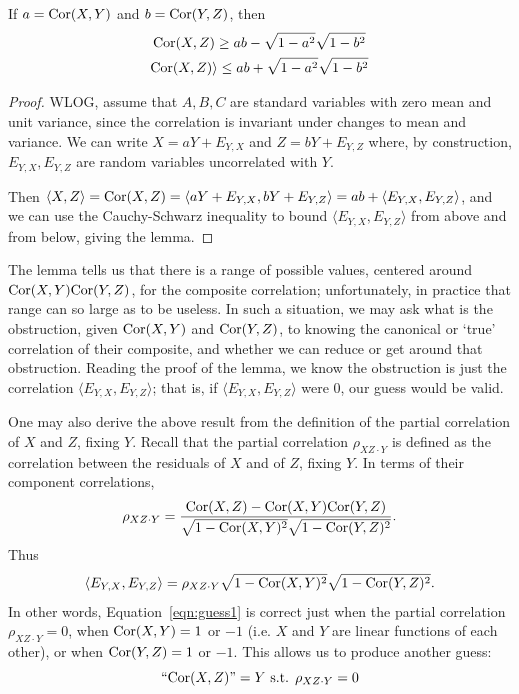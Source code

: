 \documentclass[sigconf]{acmart}
\def\Cor{\textnormal{Cor}}
\begin{document}
\begin{lemma}If $a = \Cor(X,Y)$ and $b = \Cor(Y,Z)$, then 
\begin{gather}
\Cor(X,Z) \geq ab - \sqrt{1-a^2}\sqrt{1-b^2} \\ 
\Cor(X,Z) \rangle \leq ab + \sqrt{1-a^2}\sqrt{1-b^2}
\end{gather}
\end{lemma}

\begin{proof}
WLOG, assume that $A,B,C$ are standard variables with zero mean and unit variance, since the correlation is invariant under changes to mean and variance. We can write $X = a Y + E_{Y,X}$ and $Z = b Y + E_{Y,Z}$ where, by construction, $E_{Y,X}, E_{Y,Z}$ are random variables uncorrelated with $Y$.

Then $\langle X, Z \rangle = \Cor(X,Z) = \langle aY + E_{Y,X}, bY + E_{Y,Z} \rangle = ab + \langle E_{Y,X}, E_{Y,Z} \rangle$, and we can use the Cauchy-Schwarz inequality to bound $\langle E_{Y,X}, E_{Y,Z} \rangle$ from above and from below, giving the lemma.
\end{proof}

The lemma tells us that there is a range of possible values, centered around $\Cor(X,Y)\Cor(Y,Z)$, for the composite correlation; unfortunately, in practice that range can so large as to be useless. In such a situation, we may ask what is the obstruction, given $\Cor(X,Y)$ and $\Cor(Y,Z)$, to knowing the canonical or `true' correlation of their composite, and whether we can reduce or get around that obstruction. Reading the proof of the lemma, we know the obstruction is just the correlation $\langle E_{Y,X}, E_{Y,Z} \rangle$; that is, if $\langle E_{Y,X}, E_{Y,Z} \rangle$ were 0, our guess would be valid.

One may also derive the above result from the definition of the partial correlation of $X$ and $Z$, fixing $Y$. Recall that the partial correlation $\rho_{XZ \cdot Y}$ is defined as the correlation between the residuals of $X$ and of $Z$, fixing $Y$. In terms of their component correlations,
\[ \rho_{XZ \cdot Y} = \frac{\Cor(X,Z) - \Cor(X,Y)\Cor(Y,Z)}{\sqrt{1-\Cor(X,Y)^2}\sqrt{1-\Cor(Y,Z)^2}}. \]
Thus 
\[\langle E_{Y,X}, E_{Y,Z} \rangle = \rho_{XZ \cdot Y} \sqrt{1-\Cor(X,Y)^2}\sqrt{1-\Cor(Y,Z)^2}.\] 
In other words, Equation~\ref{eqn:guess1} is correct just when the partial correlation $\rho_{XZ\cdot Y} = 0$, when $\Cor(X,Y) = 1$ or $-1$ (i.e. $X$ and $Y$ are linear functions of each other), or when $\Cor(Y,Z) = 1$ or $-1$. This allows us to produce another guess:
\begin{equation}\label{eqn:guess2}
\text{``}\Cor(X,Z)\text{''} = Y \text{ s.t. } \rho_{XZ \cdot Y} = 0
\end{equation}
\end{document}
